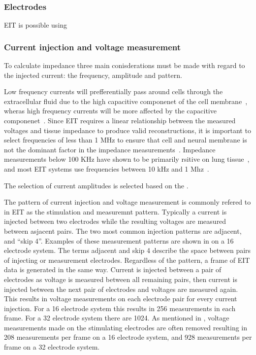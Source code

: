 \subsubsection{Electrodes} \label{sec:electrodes}
EIT is possible using 

\subsubsection{Current injection and voltage measurement}
To calculate impedance three main conisderations must be made with regard to the 
injected current: the frequency, amplitude and pattern. 

Low frequency currents will 
prefferentially pass around cells through the extracellular
fluid due to the high capacitive componenet of the cell 
membrane~\parencite{foster_whole-body_1996}, wheras high frequency currents will be 
more affected by the capacitive 
componenet~\parencite{holder_electrical_2004}. 
Since EIT requires a linear relationship between the measured voltages and 
tissue impedance to produce valid reconstructions,
it is important to select frequencies of less than 1 MHz to ensure that cell 
and neural membrane is not the dominant factor in the impedance 
measurements~\parencite{barber_applied_1984}.
Impedance measurements below 100 KHz have shown to be primarily rsitive on lung
tissue~\parencite{witsoe_electrical_1967}, and most EIT systems use
frequencies between 10 kHz and 1 Mhz~\parencite{holder_electrical_2004}.

The selection of current amplitudes is selected based on the .

The pattern of current injection and voltage measurement is commonly refered to in EIT 
as the stimulation and measuremnt pattern. Typically a current is injected between two electrodes
while the resulting voltages are measured between asjacent pairs. The two most common injection 
patterns are adjacent, and ``skip 4''. Examples of these measurement patterns are shown in 
 on a 16 electrode system. The terms adjacent and skip 4 describe 
the space between pairs of injecting or measurement electrodes. 
Regardless of the pattern, a frame of EIT data is generated in the same way. 
Current is injected between a pair of electrodes as voltage is measured between all 
remaining pairs, then current is injected between the next pair of electrodes and
voltages are measured again. This results in voltage measurements on each electrode 
pair for every current injection. For a 16 electrode system this results in 
256 measurements in each frame. For a 32 electrode system there are 1024. As mentioned in 
, voltage measurements made on the stimulating electrodes
are often removed resulting in 208 measurements per frame on a 16
electrode system, and 928 measurements per frame on a 32 electrode system.  

